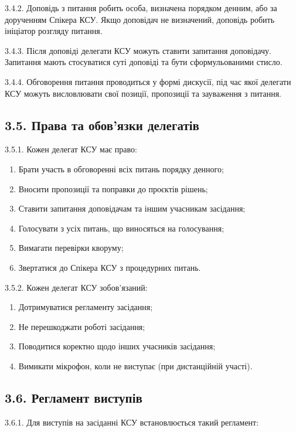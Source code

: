     3.4.2. Доповідь з питання робить особа, визначена порядком денним, або за дорученням Спікера КСУ. Якщо доповідач не визначений, доповідь робить ініціатор розгляду питання.

    3.4.3. Після доповіді делегати КСУ можуть ставити запитання доповідачу. Запитання мають стосуватися суті доповіді та бути сформульованими стисло.

    3.4.4. Обговорення питання проводиться у формі дискусії, під час якої делегати КСУ можуть висловлювати свої позиції, пропозиції та зауваження з питання.

\subsection*{3.5. Права та обов'язки делегатів}
    3.5.1. Кожен делегат КСУ має право:

        \begin{enumerate}[label=\alph*)]
            \item Брати участь в обговоренні всіх питань порядку денного;
            \item Вносити пропозиції та поправки до проєктів рішень;
            \item Ставити запитання доповідачам та іншим учасникам засідання;
            \item Голосувати з усіх питань, що виносяться на голосування;
            \item Вимагати перевірки кворуму;
            \item Звертатися до Спікера КСУ з процедурних питань.
        \end{enumerate}

    3.5.2. Кожен делегат КСУ зобов'язаний:

        \begin{enumerate}[label=\alph*)]
            \item Дотримуватися регламенту засідання;
            \item Не перешкоджати роботі засідання;
            \item Поводитися коректно щодо інших учасників засідання;
            \item Вимикати мікрофон, коли не виступає (при дистанційній участі).
        \end{enumerate}

\subsection*{3.6. Регламент виступів}
    3.6.1. Для виступів на засіданні КСУ встановлюється такий регламент:

